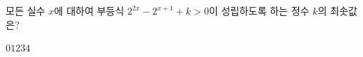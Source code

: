 모든 실수 $x$에 대하여 부등식 $2^{2x}-2^{x+1}+k>0$이 성립하도록 하는 정수 $k$의 최솟값은?
\begin{choices32}{$0$}{$1$}{$2$}{$3$}{$4$}\end{choices32}
